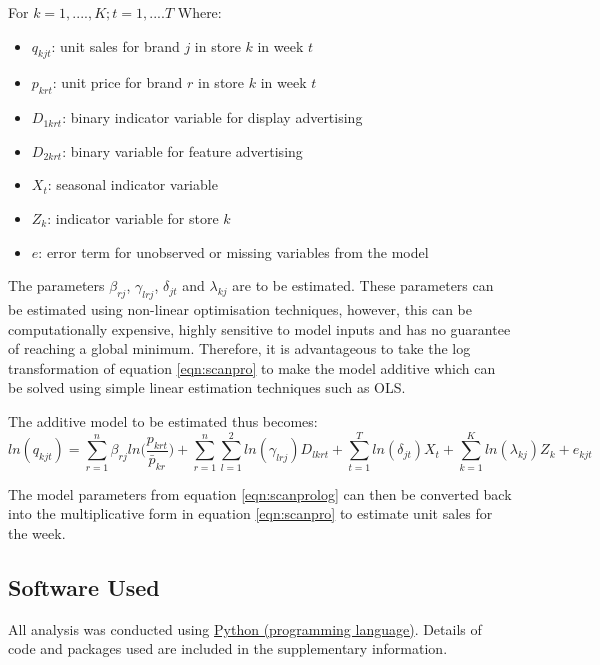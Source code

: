 \documentclass[a4paper,11pt]{article}
\begin{document}
For $k = 1, ...., K; t=1,....T$
\newline
\newline
Where:
\begin{itemize}
    \item $q_{kjt}$: unit sales for brand $j$ in store $k$ in week $t$
    \item $p_{krt}$: unit price for brand $r$ in store $k$ in week $t$
    \item $D_{1krt}$: binary indicator variable for display advertising
    \item $D_{2krt}$: binary variable for feature advertising
    \item $X_t$: seasonal indicator variable
    \item $Z_k$: indicator variable for store $k$
    \item $e$: error term for unobserved or missing variables from the model
\end{itemize}

The parameters $\beta_{rj}$, $\gamma_{lrj}$, $\delta_{jt}$ and $\lambda_{kj}$ are to be estimated. These parameters can be estimated using non-linear optimisation techniques, however, this can be computationally expensive, highly sensitive to model inputs and has no guarantee of reaching a global minimum. Therefore, it is advantageous to take the log transformation of equation \ref{eqn:scanpro} to make the model additive which can be solved using simple linear estimation techniques such as OLS. 

The additive model to be estimated thus becomes:
\begin{equation}
\label{eqn:scanprolog}
    ln(q_{kjt}) = \sum_{r=1}^n{\beta _{rj}ln\Bigg(\frac{p_{krt}}{\bar{p}_{kr}}\Bigg)+ \sum_{r=1}^n\sum_{l=1}^{2}{ln(\gamma_{lrj}){D_{lkrt}}}} + \sum_{t=1}^T{ln(\delta_{jt})X_t} + \sum_{k=1}^K{ln(\lambda_{kj})Z_k} + e_{kjt}
\end{equation}

The model parameters from equation \ref{eqn:scanprolog} can then be converted back into the multiplicative form in equation \ref{eqn:scanpro} to estimate unit sales for the week.


\subsection{Software Used}

All analysis was conducted using \href{https://www.python.org/}{Python (programming language)}. Details of code and packages used are included in the supplementary information.
\end{document}

